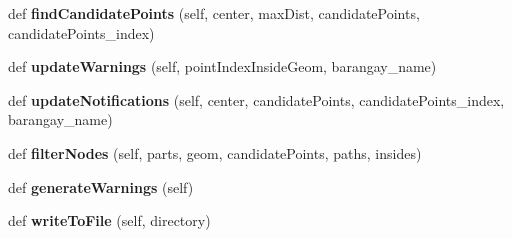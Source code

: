 \begin{DoxyCompactItemize}
\item 
\hypertarget{classsurgewarnings_1_1____init____old_1_1_warnings_a0646dd766de21dad1001470ddbee1ebf}{}def {\bfseries find\+Candidate\+Points} (self, center, max\+Dist, candidate\+Points, candidate\+Points\+\_\+index)\label{classsurgewarnings_1_1____init____old_1_1_warnings_a0646dd766de21dad1001470ddbee1ebf}

\item 
\hypertarget{classsurgewarnings_1_1____init____old_1_1_warnings_a71f5a69bc5d1f0893b78af237116d3ca}{}def {\bfseries update\+Warnings} (self, point\+Index\+Inside\+Geom, barangay\+\_\+name)\label{classsurgewarnings_1_1____init____old_1_1_warnings_a71f5a69bc5d1f0893b78af237116d3ca}

\item 
\hypertarget{classsurgewarnings_1_1____init____old_1_1_warnings_a6d6f1a7907e133446ec1995bf6d7c681}{}def {\bfseries update\+Notifications} (self, center, candidate\+Points, candidate\+Points\+\_\+index, barangay\+\_\+name)\label{classsurgewarnings_1_1____init____old_1_1_warnings_a6d6f1a7907e133446ec1995bf6d7c681}

\item 
\hypertarget{classsurgewarnings_1_1____init____old_1_1_warnings_a43e8fd812e7316ffa20fbe775b24474d}{}def {\bfseries filter\+Nodes} (self, parts, geom, candidate\+Points, paths, insides)\label{classsurgewarnings_1_1____init____old_1_1_warnings_a43e8fd812e7316ffa20fbe775b24474d}

\item 
\hypertarget{classsurgewarnings_1_1____init____old_1_1_warnings_a5f7a3dc22aee79b36488baaca483a644}{}def {\bfseries generate\+Warnings} (self)\label{classsurgewarnings_1_1____init____old_1_1_warnings_a5f7a3dc22aee79b36488baaca483a644}

\item 
\hypertarget{classsurgewarnings_1_1____init____old_1_1_warnings_ae730af1ba94a664bf6adabb56e9a92b6}{}def {\bfseries write\+To\+File} (self, directory)\label{classsurgewarnings_1_1____init____old_1_1_warnings_ae730af1ba94a664bf6adabb56e9a92b6}

\end{DoxyCompactItemize}
